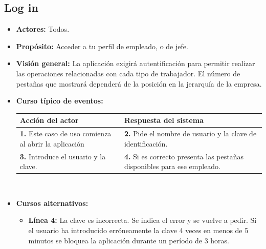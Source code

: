 \documentclass[spanish,a4paper,12pt]{report}	%
\begin{document}
	\subsection{Log in}		
			\begin{itemize}
			\item \textbf{Actores:} Todos.
			\item \textbf{Propósito:} Acceder a tu perfil de empleado, o de jefe.
			\item \textbf{Visión general:} La aplicación exigirá autentificación para permitir realizar las operaciones relacionadas con cada tipo de trabajador. El número de pestañas que mostrará dependerá de la posición en la jerarquía de la empresa. 
			\item \textbf{Curso típico de eventos:} 	\\
				\begin{tabular}{|p{6cm}||p{6cm}|}
				\hline
				\textbf{Acción del actor} & \textbf{Respuesta del sistema} \\ \hline \hline
				\textbf{1.} Este caso de uso comienza al abrir la aplicación & \textbf{2.} Pide el nombre de usuario y  la clave de identificación.\\ \hline 
				\textbf{3.} Introduce el usuario y  la clave. & \textbf{4.} Si es correcto presenta las pestañas disponibles para ese empleado.\\ \hline
			\end{tabular}
			\\
			\item \textbf{Cursos alternativos:} 
			\begin{itemize}
			\item  \textbf{Línea 4:} La clave es incorrecta. Se indica el error y se vuelve a pedir. Si el usuario ha introducido erróneamente la clave 4 veces en menos de 5 minutos se bloquea la aplicación durante un período de 3 horas.
			\end {itemize}
		\end{itemize}

	
	\hspace{-0.6 true cm}	
		
\end{document}
